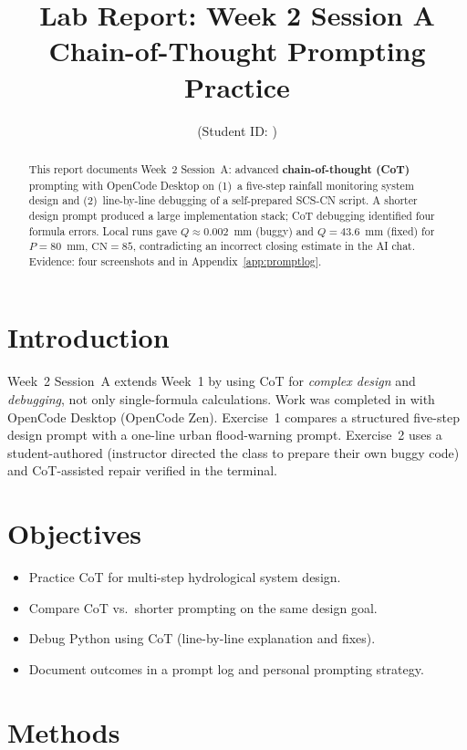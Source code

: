 \documentclass[11pt,a4paper]{article}
\title{Lab Report: Week 2 Session A\\Chain-of-Thought Prompting Practice}
\author{\studentname \quad (Student ID: \studentid)}
\date{\reportdate}
\begin{document}
\maketitle

\begin{abstract}
This report documents Week~2 Session~A: advanced \textbf{chain-of-thought (CoT)} prompting with OpenCode Desktop on (1)~a five-step rainfall monitoring system design and (2)~line-by-line debugging of a self-prepared SCS-CN script. A shorter design prompt produced a large implementation stack; CoT debugging identified four formula errors. Local runs gave $Q \approx 0.002$~mm (buggy) and $Q = 43.6$~mm (fixed) for $P=80$~mm, $\mathrm{CN}=85$, contradicting an incorrect closing estimate in the AI chat. Evidence: four screenshots and  in Appendix~\ref{app:promptlog}.
\end{abstract}

\section{Introduction}
Week~2 Session~A extends Week~1 by using CoT for \emph{complex design} and \emph{debugging}, not only single-formula calculations. Work was completed in  with OpenCode Desktop (OpenCode Zen). Exercise~1 compares a structured five-step design prompt with a one-line urban flood-warning prompt. Exercise~2 uses a student-authored  (instructor directed the class to prepare their own buggy code) and CoT-assisted repair verified in the terminal.

\section{Objectives}
\begin{itemize}[noitemsep]
  \item Practice CoT for multi-step hydrological system design.
  \item Compare CoT vs.\ shorter prompting on the same design goal.
  \item Debug Python using CoT (line-by-line explanation and fixes).
  \item Document outcomes in a prompt log and personal prompting strategy.
\end{itemize}

\section{Methods}
\end{document}
